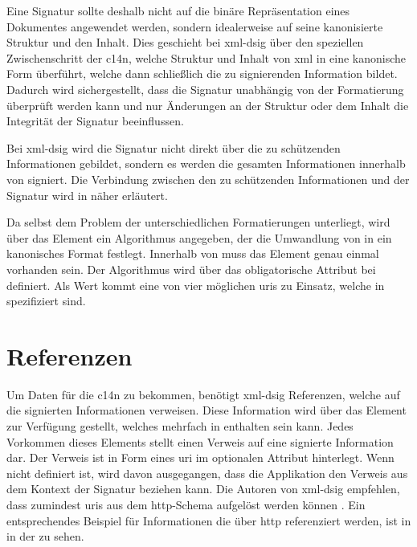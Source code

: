 Eine Signatur sollte deshalb nicht auf die binäre Repräsentation eines Dokumentes angewendet werden, sondern idealerweise auf seine kanonisierte
Struktur und den Inhalt. Dies geschieht bei \gls{xml-dsig} über den speziellen Zwischenschritt der \gls{c14n}, welche Struktur und Inhalt von \gls{xml} in eine kanonische 
Form überführt\cite{xml-c14n:w3c,xml-exc-c14n:w3c}, welche dann schließlich die zu signierenden Information bildet. Dadurch wird sichergestellt, dass die Signatur 
unabhängig von der Formatierung überprüft werden kann und nur Änderungen an der Struktur oder dem Inhalt die Integrität der Signatur beeinflussen. 

Bei \gls{xml-dsig} wird die Signatur nicht direkt über die zu schützenden Informationen gebildet, sondern es werden die gesamten Informationen innerhalb von
 signiert. Die Verbindung zwischen den zu schützenden Informationen und der Signatur wird in  näher erläutert.

Da  selbst dem Problem der unterschiedlichen Formatierungen unterliegt, wird über das Element  ein
Algorithmus angegeben, der die Umwandlung von  in ein kanonisches Format festlegt. Innerhalb von  muss das Element
 genau einmal vorhanden sein. Der Algorithmus wird über das obligatorische Attribut 
bei  definiert. Als Wert kommt eine von vier möglichen \glspl{uri} zu Einsatz, welche in \cite{xml-dsig:w3c} spezifiziert sind.

\section{Referenzen}
\label{sec:XML-DSig:Referenzen}
Um Daten für die \gls{c14n} zu bekommen, benötigt \gls{xml-dsig} Referenzen, welche auf die signierten Informationen verweisen. Diese Information wird über das 
Element  zur Verfügung gestellt, welches mehrfach in  enthalten sein kann. Jedes Vorkommen dieses Elements stellt einen
Verweis auf eine signierte Information dar. Der Verweis ist in Form eines \gls{uri} im optionalen Attribut  hinterlegt. Wenn
 nicht definiert ist, wird davon ausgegangen, dass die Applikation den Verweis aus dem Kontext der Signatur beziehen kann. Die
Autoren von \gls{xml-dsig} empfehlen, dass zumindest \glspl{uri} aus dem \gls{http}-Schema aufgelöst werden können \cite{xml-dsig:w3c}. Ein entsprechendes
Beispiel für Informationen die über \gls{http} referenziert werden, ist in  in der
 zu sehen.

